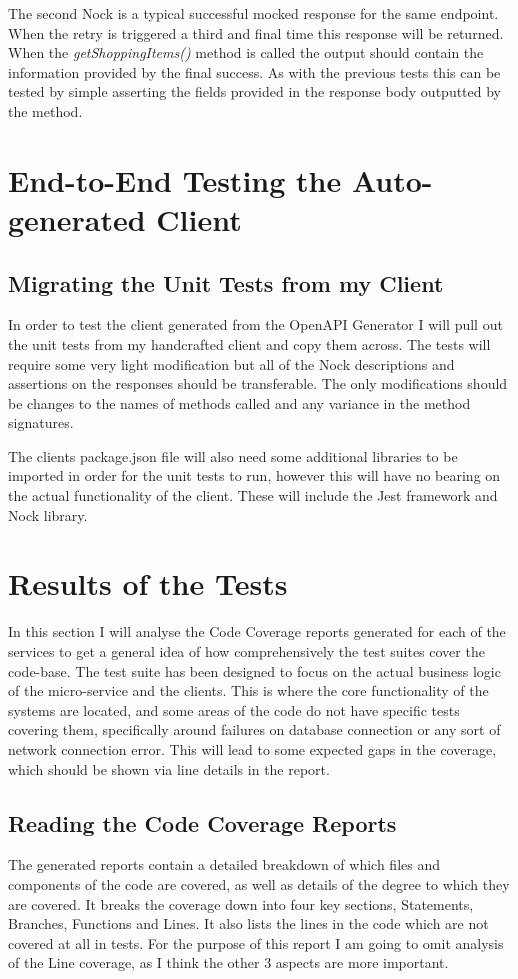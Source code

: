 The second Nock is a typical successful mocked response for the same endpoint. When the retry is triggered a third and final time this response will be returned. When the \textit{getShoppingItems()} method is called the output should contain the information provided by the final success. As with the previous tests this can be tested by simple asserting the fields provided in the response body outputted by the method.
\section{End-to-End Testing the Auto-generated Client}
\subsection{Migrating the Unit Tests from my Client}
In order to test the client generated from the OpenAPI Generator I will pull out the unit tests from my handcrafted client and copy them across. The tests will require some very light modification but all of the Nock descriptions and assertions on the responses should be transferable. The only modifications should be changes to the names of methods called and any variance in the method signatures.

The clients package.json file will also need some additional libraries to be imported in order for the unit tests to run, however this will have no bearing on the actual functionality of the client. These will include the Jest framework and Nock library.
\section{Results of the Tests}
In this section I will analyse the Code Coverage reports generated for each of the services to get a general idea of how comprehensively the test suites cover the code-base. The test suite has been designed to focus on the actual business logic of the micro-service and the clients. This is where the core functionality of the systems are located, and some areas of the code do not have specific tests covering them, specifically around failures on database connection or any sort of network connection error. This will lead to some expected gaps in the coverage, which should be shown via line details in the report.
\subsection{Reading the Code Coverage Reports}
The generated reports contain a detailed breakdown of which files and components of the code are covered, as well as details of the degree to which they are covered. It breaks the coverage down into four key sections, Statements, Branches, Functions and Lines. It also lists the lines in the code which are not covered at all in tests. For the purpose of this report I am going to omit analysis of the Line coverage, as I think the other 3 aspects are more important.
